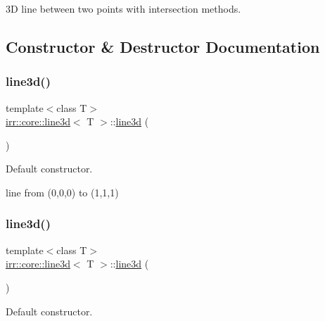 3D line between two points with intersection methods. 

\subsection{Constructor \& Destructor Documentation}
\mbox{\label{classirr_1_1core_1_1line3d_ab88640572a102a9eebd1bf483b7d7e75}} 
\subsubsection{\texorpdfstring{line3d()}{line3d()}\hspace{0.1cm}{\footnotesize\ttfamily [1/2]}}
{\footnotesize\ttfamily template$<$class T$>$ \\
\hyperlink{classirr_1_1core_1_1line3d}{irr\+::core\+::line3d}$<$ T $>$\+::\hyperlink{classirr_1_1core_1_1line3d}{line3d} (\begin{DoxyParamCaption}{ }\end{DoxyParamCaption})\hspace{0.3cm}{\ttfamily [inline]}}



Default constructor. 

line from (0,0,0) to (1,1,1) \mbox{\label{classirr_1_1core_1_1line3d_ab88640572a102a9eebd1bf483b7d7e75}} 
\subsubsection{\texorpdfstring{line3d()}{line3d()}\hspace{0.1cm}{\footnotesize\ttfamily [2/2]}}
{\footnotesize\ttfamily template$<$class T$>$ \\
\hyperlink{classirr_1_1core_1_1line3d}{irr\+::core\+::line3d}$<$ T $>$\+::\hyperlink{classirr_1_1core_1_1line3d}{line3d} (\begin{DoxyParamCaption}{ }\end{DoxyParamCaption})\hspace{0.3cm}{\ttfamily [inline]}}



Default constructor. 


